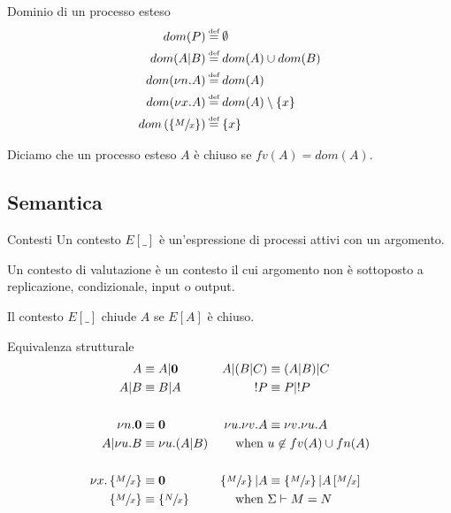\begin{frame}{Dominio di un processo esteso}
  \begin{align*}
    dom(P) & \eqdef \emptyset \\
    dom(A|B) & \eqdef dom(A) \cup dom(B) \\
    dom(\nu n.A) & \eqdef dom(A) \\
    dom(\nu x.A) & \eqdef dom(A) \setminus \set{x}\\
    dom\pa{ \set{ \sfrac{M}{x}}} & \eqdef \set{x}           
  \end{align*}
  \vfill
  
  \begin{mydef}
    Diciamo che un processo esteso $A$ \`e chiuso se $fv(A) = dom(A)$.
  \end{mydef}
\end{frame}

\subsection{Semantica}

\begin{frame}{Contesti}
  Un contesto $E[\_]$ \`e un'espressione di processi attivi con un argomento.
  \begin{mydef}
    Un contesto di valutazione \`e un contesto il cui argomento non
    \`e sottoposto a replicazione, condizionale, input o output.
  \end{mydef}
  \begin{mydef}
    Il contesto $E[\_]$ chiude $A$ se $E[A]$ \`e chiuso.
  \end{mydef}
\end{frame}


\begin{frame}{Equivalenza strutturale}
  \begin{align*}
    A & \equiv A|\mathbf{0} & A|(B|C) & \equiv (A|B)|C \\
    A|B & \equiv B|A & !P & \equiv P|!P \\ \\
    \nu n.\mathbf{0} & \equiv \mathbf{0} & \nu u. \nu v.A & \equiv \nu v. \nu
                                                   u.A \\
    A| \nu u.B & \equiv \nu u. (A|B) & \text{when } & u\not\in fv(A)
                                                     \cup fn(A) \\ \\
    \nu x. \left\{\sfrac{M}{x}\right\} & \equiv \mathbf{0} & \left\{\sfrac{M}{x}\right\}
                                                    |A & \equiv
                                                         \left\{\sfrac{M}{x}\right\}
                                                         |
                                                         A\left[\sfrac{M}{x}\right]
    \\
    \left\{\sfrac{M}{x}\right\} & \equiv \left\{\sfrac{N}{x}\right\} & \text{when } &
                                                                   \Sigma
                                                                   \vdash M=N
  \end{align*}
\end{frame}

